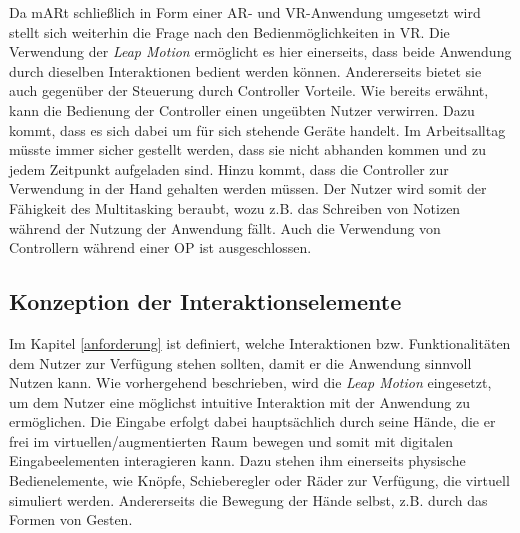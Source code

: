 Da mARt schließlich in Form einer AR- und VR-Anwendung umgesetzt wird stellt sich weiterhin die Frage nach den Bedienmöglichkeiten in VR. Die Verwendung der \textit{Leap Motion} ermöglicht es hier einerseits, dass beide Anwendung durch dieselben Interaktionen bedient werden können. Andererseits bietet sie auch gegenüber der Steuerung durch Controller Vorteile. 
Wie bereits erwähnt, kann die Bedienung der Controller einen ungeübten Nutzer verwirren. Dazu kommt, dass es sich dabei um für sich stehende Geräte handelt. Im Arbeitsalltag müsste immer sicher gestellt werden, dass sie nicht abhanden kommen und zu jedem Zeitpunkt aufgeladen sind. 
Hinzu kommt, dass die Controller zur Verwendung in der Hand gehalten werden müssen. Der Nutzer wird somit der Fähigkeit des Multitasking beraubt, wozu z.B. das Schreiben von Notizen während der Nutzung der Anwendung fällt. Auch die Verwendung von Controllern während einer OP ist ausgeschlossen.

\subsection{Konzeption der Interaktionselemente}

Im Kapitel \ref{anforderung} ist definiert, welche Interaktionen bzw. Funktionalitäten dem Nutzer zur Verfügung stehen sollten, damit er die Anwendung sinnvoll Nutzen kann. 
Wie vorhergehend beschrieben, wird die \textit{Leap Motion} eingesetzt, um dem Nutzer eine möglichst intuitive Interaktion mit der Anwendung zu ermöglichen. Die Eingabe erfolgt dabei hauptsächlich durch seine Hände, die er frei im virtuellen/augmentierten Raum bewegen und somit mit digitalen Eingabeelementen interagieren kann. 
Dazu stehen ihm einerseits physische Bedienelemente, wie Knöpfe, Schieberegler oder Räder zur Verfügung, die virtuell simuliert werden. Andererseits die Bewegung der Hände selbst, z.B. durch das Formen von Gesten.

